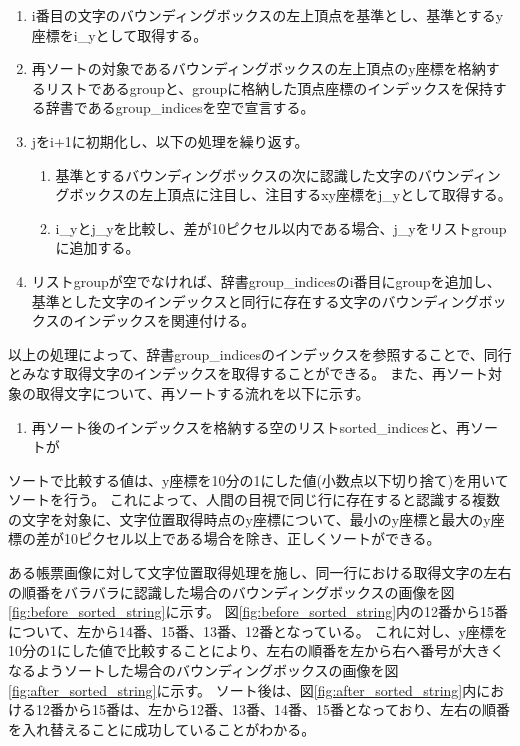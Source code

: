 \begin{enumerate}
    \item i番目の文字のバウンディングボックスの左上頂点を基準とし、基準とするy座標をi\_yとして取得する。
    \item 再ソートの対象であるバウンディングボックスの左上頂点のy座標を格納するリストであるgroupと、groupに格納した頂点座標のインデックスを保持する辞書であるgroup\_indicesを空で宣言する。
    \item jをi+1に初期化し、以下の処理を繰り返す。
    \begin{enumerate}
        \item 基準とするバウンディングボックスの次に認識した文字のバウンディングボックスの左上頂点に注目し、注目するxy座標をj\_yとして取得する。
        \item i\_yとj\_yを比較し、差が10ピクセル以内である場合、j\_yをリストgroupに追加する。
    \end{enumerate}
    \item リストgroupが空でなければ、辞書group\_indicesのi番目にgroupを追加し、基準とした文字のインデックスと同行に存在する文字のバウンディングボックスのインデックスを関連付ける。
\end{enumerate}

以上の処理によって、辞書group\_indicesのインデックスを参照することで、同行とみなす取得文字のインデックスを取得することができる。
また、再ソート対象の取得文字について、再ソートする流れを以下に示す。

\begin{enumerate}
    \item 再ソート後のインデックスを格納する空のリストsorted\_indicesと、再ソートが
\end{enumerate}


ソートで比較する値は、y座標を10分の1にした値(小数点以下切り捨て)を用いてソートを行う。
これによって、人間の目視で同じ行に存在すると認識する複数の文字を対象に、文字位置取得時点のy座標について、最小のy座標と最大のy座標の差が10ピクセル以上である場合を除き、正しくソートができる。

ある帳票画像に対して文字位置取得処理を施し、同一行における取得文字の左右の順番をバラバラに認識した場合のバウンディングボックスの画像を図\ref{fig:before_sorted_string}に示す。
図\ref{fig:before_sorted_string}内の12番から15番について、左から14番、15番、13番、12番となっている。
これに対し、y座標を10分の1にした値で比較することにより、左右の順番を左から右へ番号が大きくなるようソートした場合のバウンディングボックスの画像を図\ref{fig:after_sorted_string}に示す。
ソート後は、図\ref{fig:after_sorted_string}内における12番から15番は、左から12番、13番、14番、15番となっており、左右の順番を入れ替えることに成功していることがわかる。

